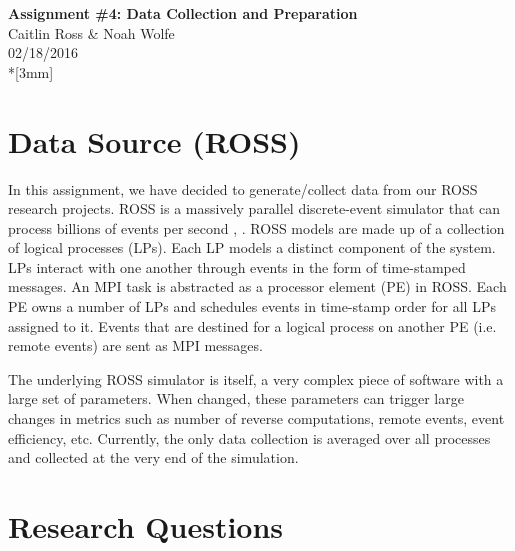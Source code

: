 \documentclass[12pt]{article}
\begin{document}
\thispagestyle{empty}
\begin{center}
{\Large\bf Assignment \#4: Data Collection and Preparation}
\vspace{3mm}
\\Caitlin Ross \& Noah Wolfe
\\02/18/2016
\\*[3mm]
\end{center}
\section{Data Source (ROSS)}
In this assignment, we have decided to generate/collect data from our ROSS research projects. 
ROSS is a massively parallel discrete-event simulator that
can process billions of events per second \cite{Holder}, \cite{Bauer}. ROSS
models are made up of a collection of logical processes (LPs).
Each LP models a distinct component of the system. LPs
interact with one another through events in the form of time-stamped messages. An MPI task is abstracted as a processor
element (PE) in ROSS. Each PE owns a number of LPs and
schedules events in time-stamp order for all LPs assigned to
it. Events that are destined for a logical process on another
PE (i.e. remote events) are sent as MPI messages. 

The underlying ROSS simulator is itself, a very complex piece of software with a large set of parameters. When changed, these parameters can trigger large changes in metrics such as number of reverse computations, remote events, event efficiency, etc. Currently, the only data collection is averaged over all processes and collected at the very end of the simulation. 

\section{Research Questions} \label{questions}
\end{document}
